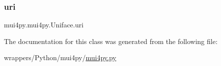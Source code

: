 \mbox{\label{classmui4py_1_1mui4py_1_1_uniface_a0966f7e27032d2f5df4f308e5ede03f3}} 
\subsubsection{\texorpdfstring{uri}{uri}}
{\footnotesize\ttfamily mui4py.\+mui4py.\+Uniface.\+uri}



The documentation for this class was generated from the following file\+:\begin{DoxyCompactItemize}
\item 
wrappers/\+Python/mui4py/\hyperlink{mui4py_8py}{mui4py.\+py}\end{DoxyCompactItemize}
